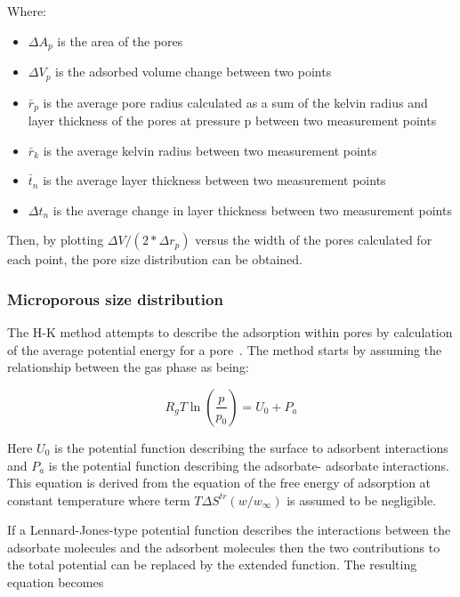 Where:
\begin{itemize}
    
    \item \(\Delta A_p\) is the area of the pores
    \item \(\Delta V_p\) is the adsorbed volume change between two points
    \item \(\bar{r}_p\) is the average pore radius calculated as a sum of the
    kelvin radius and layer thickness of the pores at pressure p between two
    measurement points
    \item \(\bar{r}_k\) is the average kelvin radius between two measurement points
    \item \(\bar{t}_n\) is the average layer thickness between two measurement points
    \item \(\Delta t_n\) is the average change in layer thickness between two measurement points
\end{itemize}

Then, by plotting \(\Delta V/(2*\Delta r_p)\) versus the width of the pores calculated
for each point, the pore size distribution can be obtained.

\subsubsection{Microporous size distribution}

The H-K method attempts to describe the adsorption within pores by calculation
of the average potential energy for a pore~\cite{horvathMethodCalculationEffective1983}.
The method starts by assuming the
relationship between the gas phase as being:

\begin{equation}
    R_g T \ln(\frac{p}{p_0}) = U_0 + P_a
\end{equation}

Here \(U_0\) is the potential function describing the surface to adsorbent
interactions and \(P_a\) is the potential function describing the adsorbate-
adsorbate interactions. This equation is derived from the equation of the free energy
of adsorption at constant temperature where term \(T \Delta S^{tr}(w/w_{\infty})\)
is assumed to be negligible.

If a Lennard-Jones-type potential function describes the interactions between the
adsorbate molecules and the adsorbent molecules then the two contributions to the
total potential can be replaced by the extended function. The resulting equation becomes

